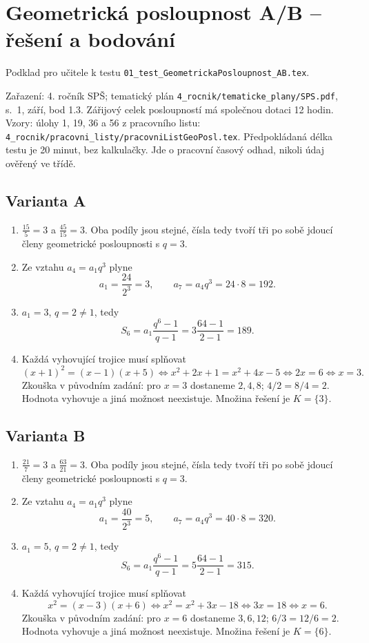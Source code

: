 \documentclass[a4paper,10pt]{article}
\begin{document}
\section*{Geometrická posloupnost A/B -- řešení a bodování}
Podklad pro učitele k testu
\texttt{01\_test\_GeometrickaPosloupnost\_AB.tex}.

Zařazení: 4. ročník SPŠ; tematický plán
\texttt{4\_rocnik/tematicke\_plany/SPS.pdf}, s.~1, září, bod 1.3.
Zářijový celek posloupností má společnou dotaci 12 hodin.
Vzory: úlohy 1, 19, 36 a 56 z pracovního listu:\\
\texttt{4\_rocnik/pracovni\_listy/pracovniListGeoPosl.tex}.
Předpokládaná délka testu je 20 minut, bez kalkulačky.
Jde o pracovní časový odhad, nikoli údaj ověřený ve třídě.

\subsection*{Varianta A}
\begin{enumerate}
\item $\frac{15}{5}=3$ a $\frac{45}{15}=3$. Oba podíly jsou stejné,
čísla tedy tvoří tři po sobě jdoucí členy geometrické posloupnosti s $q=3$.
\item Ze vztahu $a_4=a_1q^3$ plyne
\[
a_1=\frac{24}{2^3}=3,\qquad a_7=a_4q^3=24\cdot8=192.
\]
\item $a_1=3$, $q=2\ne1$, tedy
\[
S_6=a_1\frac{q^6-1}{q-1}=3\frac{64-1}{2-1}=189.
\]
\item Každá vyhovující trojice musí splňovat
\[
(x+1)^2=(x-1)(x+5)
\iff x^2+2x+1=x^2+4x-5
\iff 2x=6 \iff x=3.
\]
Zkouška v původním zadání: pro $x=3$ dostaneme $2,4,8$;
$4/2=8/4=2$. Hodnota vyhovuje a jiná možnost neexistuje.
Množina řešení je $K=\{3\}$.
\end{enumerate}

\subsection*{Varianta B}
\begin{enumerate}
\item $\frac{21}{7}=3$ a $\frac{63}{21}=3$. Oba podíly jsou stejné,
čísla tedy tvoří tři po sobě jdoucí členy geometrické posloupnosti s $q=3$.
\item Ze vztahu $a_4=a_1q^3$ plyne
\[
a_1=\frac{40}{2^3}=5,\qquad a_7=a_4q^3=40\cdot8=320.
\]
\item $a_1=5$, $q=2\ne1$, tedy
\[
S_6=a_1\frac{q^6-1}{q-1}=5\frac{64-1}{2-1}=315.
\]
\item Každá vyhovující trojice musí splňovat
\[
x^2=(x-3)(x+6)
\iff x^2=x^2+3x-18
\iff 3x=18 \iff x=6.
\]
Zkouška v původním zadání: pro $x=6$ dostaneme $3,6,12$;
$6/3=12/6=2$. Hodnota vyhovuje a jiná možnost neexistuje.
Množina řešení je $K=\{6\}$.
\end{enumerate}
\end{document}
